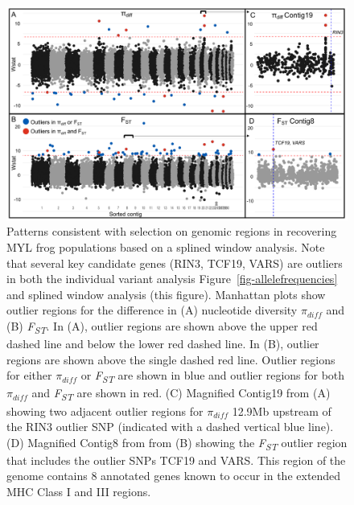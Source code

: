 \documentclass[9pt,twocolumn,twoside,lineno]{pnas-new}
\begin{document}
\begin{figure}

{\centering \includegraphics[width=\textwidth]{figures/splinewindow_manhattan.png}

}

\caption{\label{fig-spline-manhattan}Patterns consistent with selection
on genomic regions in recovering MYL frog populations based on a splined
window analysis. Note that several key candidate genes (RIN3, TCF19,
VARS) are outliers in both the individual variant analysis
Figure~\ref{fig-allelefrequencies} and splined window analysis (this
figure). Manhattan plots show outlier regions for the difference in (A)
nucleotide diversity \(\pi_{diff}\) and (B) \emph{F\textsubscript{ST}}.
In (A), outlier regions are shown above the upper red dashed line and
below the lower red dashed line. In (B), outlier regions are shown above
the single dashed red line. Outlier regions for either \(\pi_{diff}\) or
\emph{F\textsubscript{ST}} are shown in blue and outlier regions for
both \(\pi_{diff}\) and \emph{F\textsubscript{ST}} are shown in red. (C)
Magnified Contig19 from (A) showing two adjacent outlier regions for
\(\pi_{diff}\) 12.9Mb upstream of the RIN3 outlier SNP (indicated with a
dashed vertical blue line). (D) Magnified Contig8 from from (B) showing
the \emph{F\textsubscript{ST}} outlier region that includes the outlier
SNPs TCF19 and VARS. This region of the genome contains 8 annotated
genes known to occur in the extended MHC Class I and III regions.}

\end{figure}

\newpage
\end{document}
